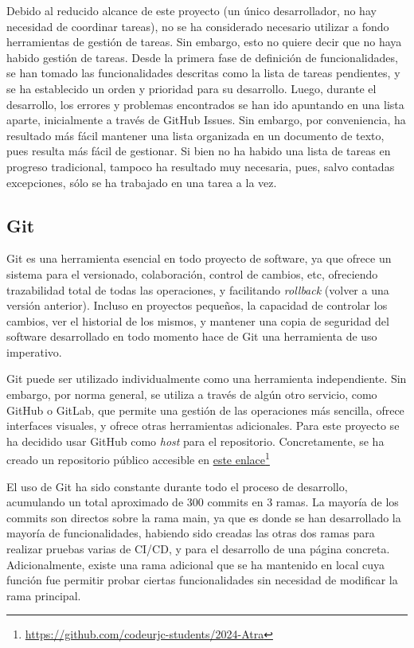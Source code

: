 Debido al reducido alcance de este proyecto (un único desarrollador, no hay necesidad de coordinar tareas), no se ha considerado necesario utilizar a fondo herramientas de gestión de tareas. Sin embargo, esto no quiere decir que no haya habido gestión de tareas. Desde la primera fase de definición de funcionalidades, se han tomado las funcionalidades descritas como la lista de tareas pendientes, y se ha establecido un orden y prioridad para su desarrollo. Luego, durante el desarrollo, los errores y problemas encontrados se han ido apuntando en una lista aparte, inicialmente a través de GitHub Issues. Sin embargo, por conveniencia, ha resultado más fácil mantener una lista organizada en un documento de texto, pues resulta más fácil de gestionar. Si bien no ha habido una lista de tareas en progreso tradicional, tampoco ha resultado muy necesaria, pues, salvo contadas excepciones, sólo se ha trabajado en una tarea a la vez.

\subsection{Git} 
Git es una herramienta esencial en todo proyecto de software, ya que ofrece un sistema para el versionado, colaboración, control de cambios, etc, ofreciendo trazabilidad total de todas las operaciones,  y facilitando \textit{rollback} (volver a una versión anterior). Incluso en proyectos pequeños, la capacidad de controlar los cambios, ver el historial de los mismos, y mantener una copia de seguridad del software desarrollado en todo momento hace de Git una herramienta de uso imperativo.

Git puede ser utilizado individualmente como una herramienta independiente. Sin embargo, por norma general, se utiliza a través de algún otro servicio, como GitHub o GitLab, que permite una gestión de las operaciones más sencilla, ofrece interfaces visuales, y ofrece otras herramientas adicionales. Para este proyecto se ha decidido usar GitHub como \textit{host} para el repositorio. Concretamente, se ha creado un repositorio público accesible en \href{https://github.com/codeurjc-students/2024-Atra}{este enlace}\footnote{\url{https://github.com/codeurjc-students/2024-Atra}}

El uso de Git ha sido constante durante todo el proceso de desarrollo, acumulando un total aproximado de 300 commits en 3 ramas. La mayoría de los commits son directos sobre la rama main, ya que es donde se han desarrollado la mayoría de funcionalidades, habiendo sido creadas las otras dos ramas para realizar pruebas varias de CI/CD, y para el desarrollo de una página concreta. Adicionalmente, existe una rama adicional que se ha mantenido en local cuya función fue permitir probar ciertas funcionalidades sin necesidad de modificar la rama principal.

